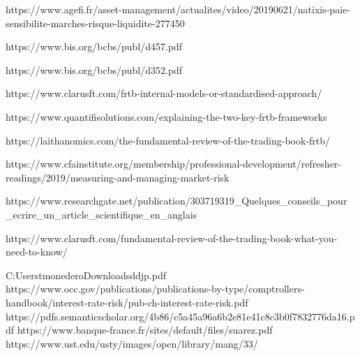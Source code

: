 \documentclass[3pt]{article}
\begin{document}
https://www.agefi.fr/asset-management/actualites/video/20190621/natixis-paie-sensibilite-marches-risque-liquidite-277450

https://www.bis.org/bcbs/publ/d457.pdf

https://www.bis.org/bcbs/publ/d352.pdf

https://www.clarusft.com/frtb-internal-models-or-standardised-approach/

https://www.quantifisolutions.com/explaining-the-two-key-frtb-frameworks

https://laithanomics.com/the-fundamental-review-of-the-trading-book-frtb/

https://www.cfainstitute.org/membership/professional-development/refresher-readings/2019/measuring-and-managing-market-risk

https://www.researchgate.net/publication/303719319\_Quelques\_conseils\_pour%
\_ecrire\_un\_article\_scientifique\_en\_anglais

https://www.clarusft.com/fundamental-review-of-the-trading-book-what-you-need-to-know/

C:\TEXTsymbol{\backslash}Users\TEXTsymbol{\backslash}tmonedero\TEXTsymbol{%
\backslash}Downloads\TEXTsymbol{\backslash}ddjp.pdf
https://www.occ.gov/publications/publications-by-type/comptrollers-handbook/interest-rate-risk/pub-ch-interest-rate-risk.pdf
https://pdfs.semanticscholar.org/4b86/c5a45a96a6b2e81e41c8c3b0f7832776da16.pdf
https://www.banque-france.fr/sites/default/files/suarez.pdf
https://www.ust.edu/usty/images/open/library/mang/33/%
\end{document}
